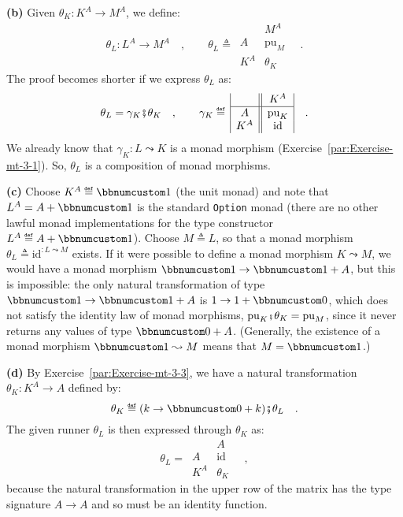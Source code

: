\textbf{(b)} Given $\theta_{K}:K^{A}\rightarrow M^{A}$, we define:
\[
\theta_{L}:L^{A}\rightarrow M^{A}\quad,\quad\quad\theta_{L}\triangleq\,\begin{array}{|c||c|}
 & M^{A}\\
\hline A & \text{pu}_{M}\\
K^{A} & \theta_{K}
\end{array}\quad.
\]
The proof becomes shorter if we express $\theta_{L}$ as:
\[
\theta_{L}=\gamma_{K}\bef\theta_{K}\quad,\quad\quad\gamma_{K}\triangleq\,\begin{array}{|c||c|}
 & K^{A}\\
\hline A & \text{pu}_{K}\\
K^{A} & \text{id}
\end{array}\quad.
\]
We already know that $\gamma_{K}:L\leadsto K$ is a monad morphism
(Exercise~\ref{par:Exercise-mt-3-1}). So, $\theta_{L}$ is a composition
of monad morphisms.

\textbf{(c)} Choose $K^{A}\triangleq\bbnum 1$ (the unit monad) and
note that $L^{A}=A+\bbnum 1$ is the standard \lstinline!Option!
monad (there are no other lawful monad implementations for the type
constructor $L^{A}\triangleq A+\bbnum 1$). Choose $M\triangleq L$,
so that a monad morphism $\theta_{L}\triangleq\text{id}^{:L\leadsto M}$
exists. If it were possible to define a monad morphism $K\leadsto M$,
we would have a monad morphism $\bbnum 1\rightarrow\bbnum 1+A$, but
this is impossible: the only natural transformation of type $\bbnum 1\rightarrow\bbnum 1+A$
is $1\rightarrow1+\bbnum 0$, which does not satisfy the identity
law of monad morphisms, $\text{pu}_{K}\bef\theta_{K}=\text{pu}_{M}$,
since it never returns any values of type $\bbnum 0+A$. (Generally,
the existence of a monad morphism $\bbnum 1\leadsto M$ means that
$M=\bbnum 1$.)

\textbf{(d)} By Exercise~\ref{par:Exercise-mt-3-3}, we have a natural
transformation $\theta_{K}:K^{A}\rightarrow A$ defined by:
\[
\theta_{K}\triangleq(k\rightarrow\bbnum 0+k)\bef\theta_{L}\quad.
\]
The given runner $\theta_{L}$ is then expressed through $\theta_{K}$
as:
\[
\theta_{L}=\,\begin{array}{|c||c|}
 & A\\
\hline A & \text{id}\\
K^{A} & \theta_{K}
\end{array}\quad,
\]
because the natural transformation in the upper row of the matrix
has the type signature $A\rightarrow A$ and so must be an identity
function.

